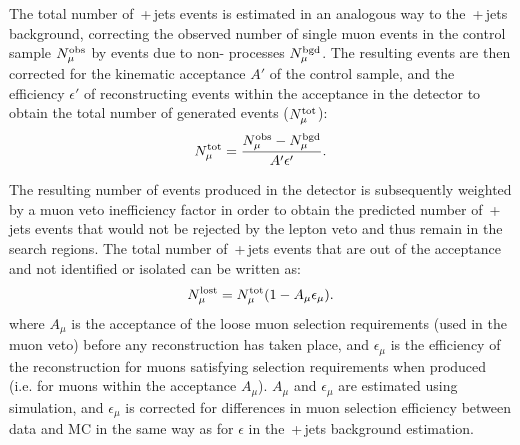 The total number of \wmunubr{}\,+\,jets events is estimated in an analogous way to the \znunubr{}\,+\,jets background,
correcting the observed number of single muon events in the control sample $N^{\rm obs}_{\mu}$ by events due to non-\wpj{} processes $N^{\rm bgd}_{\mu}$.  
The resulting \wmunu events are then corrected for the kinematic acceptance $A'$ of the control sample, and the efficiency $\epsilon'$ of reconstructing events within the acceptance in the detector to obtain the total number of generated events ($N^{\rm tot}_{\mu}$):
\begin{equation}
N^{\rm tot}_{\mu} = \frac{N^{\rm obs}_{\mu} - N^{\rm bgd}_{\mu}}{A'\epsilon'}.\label{eqn:Ntot}
\end{equation}

The resulting number of \wmunu events produced in the detector is subsequently weighted by a muon veto inefficiency factor in order to obtain the predicted number of \wmunubr{}\,+\,jets events that would not be rejected by the lepton veto and thus remain in the search regions.
%
The total number of \wmunubr{}\,+\,jets events that are out of the acceptance and not identified or isolated can be written as:
\begin{equation}
N^{\rm lost}_{\mu} = N^{\rm tot}_{\mu}(1 - A_{\mu}\epsilon_{\mu}).
\end{equation}
where $A_{\mu}$ is the acceptance of the loose muon selection requirements (used in the muon veto) before any reconstruction has taken place, 
and $\epsilon_{\mu}$ is the efficiency of the reconstruction for muons satisfying selection requirements when produced (i.e. for muons within the acceptance $A_{\mu}$).
$A_{\mu}$ and $\epsilon_{\mu}$ are estimated using simulation, and $\epsilon_{\mu}$ is corrected for differences in muon selection efficiency between data and MC in the same way as for $\epsilon$ in the \znunubr{}\,+\,jets background estimation.

